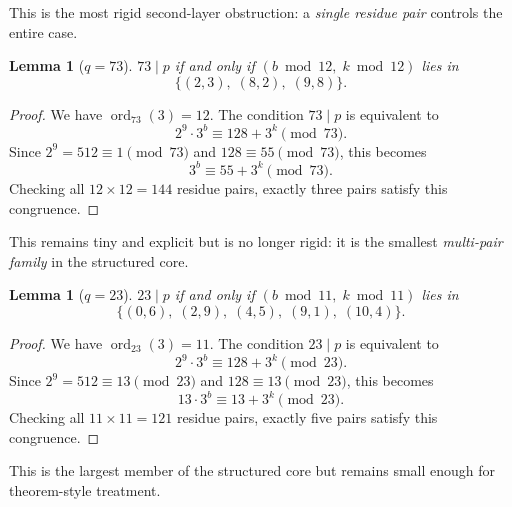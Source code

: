 \documentclass[11pt,letterpaper]{article}
\newtheorem{lemma}[theorem]{Lemma}
\begin{document}
This is the most rigid second-layer obstruction: a \emph{single residue pair} controls the entire case.

\begin{lemma}[$q = 73$]\label{lem:q73}
$73 \mid p$ if and only if $(b \bmod 12,\; k \bmod 12)$ lies in
\begin{equation}
    \{(2, 3),\; (8, 2),\; (9, 8)\}.
\end{equation}
\end{lemma}

\begin{proof}
We have $\operatorname{ord}_{73}(3) = 12$.
The condition $73 \mid p$ is equivalent to
\begin{equation}
    2^9 \cdot 3^b \equiv 128 + 3^k \pmod{73}.
\end{equation}
Since $2^9 = 512 \equiv 1 \pmod{73}$ and $128 \equiv 55 \pmod{73}$, this becomes
\begin{equation}
    3^b \equiv 55 + 3^k \pmod{73}.
\end{equation}
Checking all $12 \times 12 = 144$ residue pairs, exactly three pairs satisfy this congruence.
\end{proof}

This remains tiny and explicit but is no longer rigid: it is the smallest \emph{multi-pair family} in the structured core.

\begin{lemma}[$q = 23$]\label{lem:q23}
$23 \mid p$ if and only if $(b \bmod 11,\; k \bmod 11)$ lies in
\begin{equation}
    \{(0, 6),\; (2, 9),\; (4, 5),\; (9, 1),\; (10, 4)\}.
\end{equation}
\end{lemma}

\begin{proof}
We have $\operatorname{ord}_{23}(3) = 11$.
The condition $23 \mid p$ is equivalent to
\begin{equation}
    2^9 \cdot 3^b \equiv 128 + 3^k \pmod{23}.
\end{equation}
Since $2^9 = 512 \equiv 13 \pmod{23}$ and $128 \equiv 13 \pmod{23}$, this becomes
\begin{equation}
    13 \cdot 3^b \equiv 13 + 3^k \pmod{23}.
\end{equation}
Checking all $11 \times 11 = 121$ residue pairs, exactly five pairs satisfy this congruence.
\end{proof}

This is the largest member of the structured core but remains small enough for theorem-style treatment.
\end{document}
